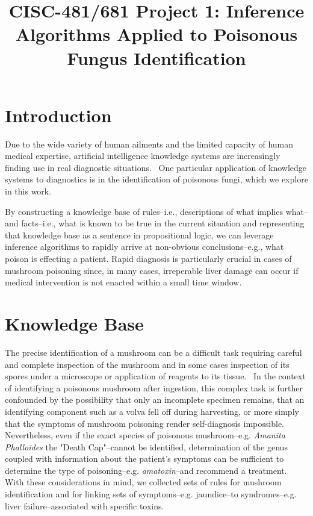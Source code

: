 \documentclass[12pt, conference, compsocconf]{IEEEtran}
\begin{document}
\title{CISC-481/681 Project 1: Inference Algorithms Applied to Poisonous Fungus Identification}

\author{ }

\maketitle

\section{Introduction}
Due to the wide variety of human ailments and the limited capacity of human medical expertise, artificial intelligence knowledge systems are increasingly finding use in real diagnostic situations.~\cite{expert-systems-in-diagnosis}
One particular application of knowledge systems to diagnostics is in the identification of poisonous fungi, which we explore in this work. 

By constructing a knowledge base of rules--i.e., descriptions of what implies what--and facts--i.e., what is known to be true in the current situation and representing that knowledge base as a sentence in propositional logic, we can leverage inference algorithms to rapidly arrive at non-obvious conclusions--e.g., what poison is effecting a patient. 
Rapid diagnosis is particularly crucial in cases of mushroom poisoning since, in many cases, irreperable liver damage can occur if medical intervention is not enacted within a small time window.

\section{Knowledge Base}
The precise identification of a mushroom can be a difficult task requiring careful and complete inspection of the mushroom and in some cases inspection of its spores under a microscope or application of reagents to its tissue.~\cite{handbook-mushroom-poison}
In the context of identifying a poisonous mushroom after ingestion, this complex task is further confounded by the possibility that only an incomplete specimen remains, that an identifying component such as a volva fell off during harvesting, or more simply that the symptoms of mushroom poisoning render self-diagnosis impossible. 
Nevertheless, even if the exact species of poisonous mushroom--e.g. \emph{Amanita Phalloides} the "Death Cap"--cannot be identified, determination of the genus coupled with information about the patient's symptoms can be sufficient to determine the type of poisoning--e.g. \emph{amatoxin}--and recommend a treatment. 
With these considerations in mind, we collected sets of rules for mushroom identification and for linking sets of symptoms--e.g. jaundice--to syndromes--e.g. liver failure--associated with specific toxins. 
\end{document}
